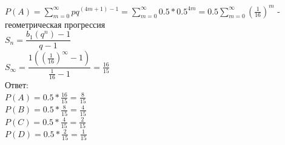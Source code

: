 \documentclass[fleqn]{article}
\begin{document}
$ P(A) = \displaystyle\sum_{m=0}^{\infty}pq^{(4m+1) - 1} =\displaystyle\sum_{m=0}^{\infty}0.5 * 0.5^{4m} = 0.5 \displaystyle\sum_{m=0}^{\infty}(\frac{1}{16})^m $  - геометрическая прогрессия\\
$S_n = \dfrac{b_1(q^n) - 1}{q-1}$ \\
$S_{\infty} = \dfrac{1((\frac{1}{16})^{\infty} - 1) }{\frac{1}{16}-1} = \frac{16}{15}$ \\ 
Ответ: \\
$ P(A)  = 0.5 *  \frac{16}{15} = \frac{8}{15} $ \\
$ P(B)  = 0.5 * \frac{8}{15} = \frac{4}{15} $ \\
$ P(C)  = 0.5 * \frac{4}{15} = \frac{2}{15} $ \\
$ P(D)  = 0.5 * \frac{2}{15} = \frac{1}{15} $ \\
\end{document}
